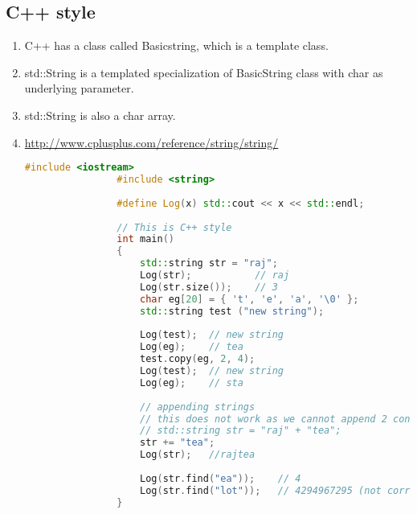 \documentclass{article}
\begin{document}
    \subsection{C++ style}
        \begin{enumerate}
            \item C++ has a class called Basicstring, which is a template class.
            \item std::String is a templated specialization of BasicString class with char as underlying parameter.
            \item std::String is also a char array.
            \item \url{http://www.cplusplus.com/reference/string/string/}
             \begin{lstlisting}[language=C++, caption=C++ style strings]
                #include <iostream>
                #include <string> 
                
                #define Log(x) std::cout << x << std::endl;
                
                // This is C++ style
                int main()
                {
                	std::string str = "raj";
                	Log(str);			// raj
                	Log(str.size());	// 3
                	char eg[20] = { 't', 'e', 'a', '\0' };
                	std::string test ("new string");
                	
                	Log(test);	// new string
                	Log(eg);	// tea
                	test.copy(eg, 2, 4);
                	Log(test);	// new string
                	Log(eg);	// sta
                
                	// appending strings
                	// this does not work as we cannot append 2 const char arrays
                	// std::string str = "raj" + "tea";
                	str += "tea";
                	Log(str);	//rajtea
                
                	Log(str.find("ea"));	// 4
                	Log(str.find("lot"));	// 4294967295 (not correct)
                }
             \end{lstlisting}
        \end{enumerate}      
        
\end{document}
